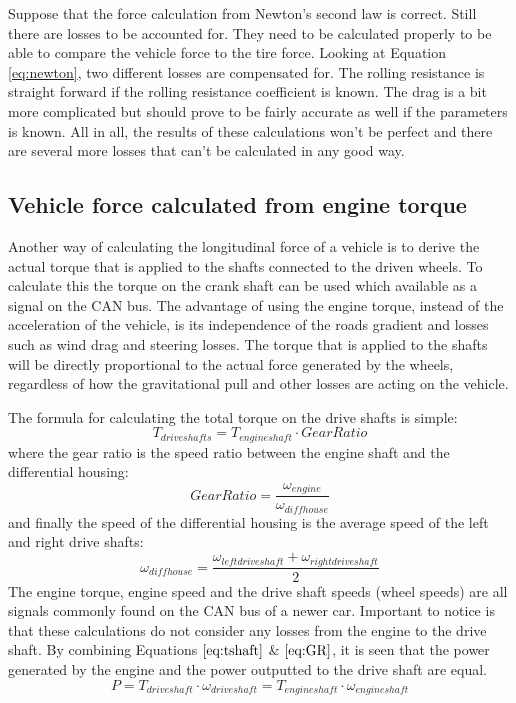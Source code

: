 Suppose that the force calculation from Newton's second law is correct. Still there are losses to be accounted for. They need to be calculated properly to be able to compare the vehicle force to the tire force. Looking at Equation \ref{eq:newton}, two different losses are compensated for. The rolling resistance is straight forward if the rolling resistance coefficient is known. The drag is a bit more complicated but should prove to be fairly accurate as well if the parameters is known. All in all, the results of these calculations won't be perfect and there are several more losses that can't be calculated in any good way.


\subsection{Vehicle force calculated from engine torque}
Another way of calculating the longitudinal force of a vehicle is to derive the actual torque that is applied to the shafts connected to the driven wheels. To calculate this the torque on the crank shaft can be used which available as a signal on the CAN bus. The advantage of using the engine torque, instead of the acceleration of the vehicle, is its independence of the roads gradient and losses such as wind drag and steering losses. The torque that is applied to the shafts will be directly proportional to the actual force generated by the wheels, regardless of how the gravitational pull and other losses are acting on the vehicle. 

The formula for calculating the total torque on the drive shafts is simple:
\begin{equation}
\label{eq:tshaft}
T_{driveshafts} = T_{engineshaft}\cdot GearRatio
\end{equation}
where the gear ratio is the speed ratio between the engine shaft and the differential housing:
\begin{equation}
\label{eq:GR}
Gear Ratio = \frac{\omega_{engine}}{\omega_{diffhouse}}
\end{equation}
and finally the speed of the differential housing is the average speed of the left and right drive shafts:
\begin{equation}
\label{eq:diffhouse}
\omega_{diffhouse} = \frac{\omega_{leftdriveshaft}+\omega_{rightdriveshaft}}{2}
\end{equation}
The engine torque, engine speed and the drive shaft speeds (wheel speeds) are all signals commonly found on the CAN bus of a newer car. Important to notice is that these calculations do not consider any losses from the engine to the drive shaft. By combining Equations $ \ref{eq:tshaft} $ \& $ \ref{eq:GR} $, it is seen that the power generated by the engine and the power outputted to the drive shaft are equal.
\begin{equation}
P = T_{driveshaft}\cdot \omega_{driveshaft} = T_{engineshaft}\cdot \omega_{engineshaft}
\end{equation}

